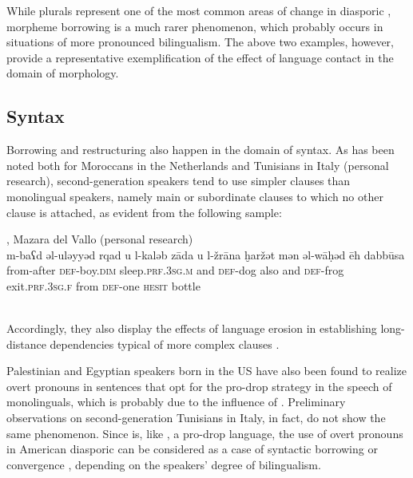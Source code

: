 \documentclass[output=paper]{langsci/langscibook}
\begin{document}
While plurals represent one of the most common areas of change in diasporic , morpheme borrowing is a much rarer phenomenon, which probably occurs in situations of more pronounced {bilingualism}. The above two examples, however, provide a representative exemplification of the effect of language contact in the domain of morphology.


 
 \subsection{Syntax}


Borrowing and restructuring also happen in the domain of syntax. As has been noted both for Moroccans in the Netherlands \citep[99]{deRuiter1989} and Tunisians in Italy (personal research), second-generation speakers tend to use simpler clauses than {monolingual} speakers, namely main or subordinate clauses to which no other clause is attached, as evident from the following sample:


\ea
{ , {Mazara del Vallo} (personal research)}\\
\gll m-baʕd əl-uləyyəd rqad u l-kaləb zāda u l-žrāna ḫaržət mən əl-wāḥəd ēh dabbūsa\\
 from-after \textsc{def}-boy.\textsc{dim} sleep\textsc{.prf.3sg.m} and \textsc{def-}dog also and \textsc{def-}frog exit\textsc{.prf.3sg.f} from \textsc{def-}one \textsc{hesit} bottle\\
\\
\z

Accordingly, they also display the effects of {language erosion} in establishing long-distance dependencies typical of more complex clauses \citep[305]{Albirini2016}.

{Palestinian} and Egyptian speakers born in the US have also been found to realize overt pronouns in sentences that opt for the pro-drop strategy in the speech of monolinguals, which is probably due to the influence of  \citep[283]{AlbiriniSaadah2014}. Preliminary observations on second-generation Tunisians in Italy, in fact, do not show the same phenomenon. Since  is, like , a pro-drop language, the use of overt pronouns in American diasporic  can be considered as a case of syntactic borrowing or {convergence} \citep{Lucas2015}, depending on the speakers’ degree of {bilingualism}.
\end{document}
